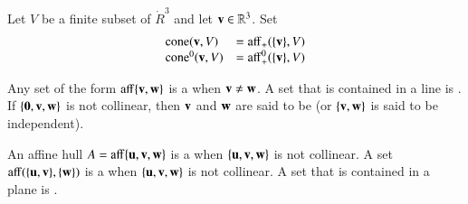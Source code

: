 \begin{definition}[cone]
Let $V$ be a finite subset of
$\ring{R}^3$ and let ${\mathbf v}\in\mathbb{R}^3$. Set
  \begin{displaymath}\begin{array}{lll}
  {\operatorname{cone}}({\mathbf v},V) &= {\operatorname{aff}}_+(\{{\mathbf v}\},V)\\
  {\operatorname{cone}}^0({\mathbf v},V) &= {\operatorname{aff}}^0_+(\{{\mathbf v}\},V)\\
  \end{array}
  \end{displaymath}
%
%
%
\end{definition}




	
\begin{definition}	
Any set of the form ${\operatorname{aff}}\{{\mathbf v},{\mathbf w}\}$ is a  when ${\mathbf v}\ne {\mathbf w}$.  A set that is contained in a line is .  If $\{{\mathbf 0},{\mathbf v},{\mathbf w}\}$ is not collinear, then ${\mathbf v}$ and ${\mathbf w}$ are said to be  (or $\{{\mathbf v},{\mathbf w}\}$ is said to be independent).
\end{definition}
%
%

\begin{definition}\label{def:plane}	
An affine hull $A={\operatorname{aff}}\{{\mathbf u},{\mathbf v},{\mathbf w}\}$ is a  when $\{{\mathbf u},{\mathbf v},{\mathbf w}\}$ is not collinear.   A set ${\operatorname{aff}}(\{{\mathbf u},{\mathbf v}\},\{{\mathbf w}\})$
is a  when $\{{\mathbf u},{\mathbf v},{\mathbf w}\}$ is not collinear. A set that is contained in a plane is  .
\end{definition}
%
%
%
%


